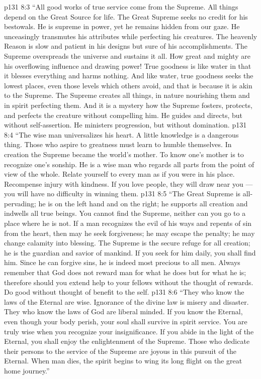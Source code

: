 \vs p131 8:3 “All good works of true service come from the Supreme. All things depend on the Great Source for life. The Great Supreme seeks no credit for his bestowals. He is supreme in power, yet he remains hidden from our gaze. He unceasingly transmutes his attributes while perfecting his creatures. The heavenly Reason is slow and patient in his designs but sure of his accomplishments. The Supreme overspreads the universe and sustains it all. How great and mighty are his overflowing influence and drawing power! True goodness is like water in that it blesses everything and harms nothing. And like water, true goodness seeks the lowest places, even those levels which others avoid, and that is because it is akin to the Supreme. The Supreme creates all things, in nature nourishing them and in spirit perfecting them. And it is a mystery how the Supreme fosters, protects, and perfects the creature without compelling him. He guides and directs, but without self\hyp{}assertion. He ministers progression, but without domination.
\vs p131 8:4 “The wise man universalizes his heart. A little knowledge is a dangerous thing. Those who aspire to greatness must learn to humble themselves. In creation the Supreme became the world’s mother. To know one’s mother is to recognize one’s sonship. He is a wise man who regards all parts from the point of view of the whole. Relate yourself to every man as if you were in his place. Recompense injury with kindness. If you love people, they will draw near you --- you will have no difficulty in winning them.
\vs p131 8:5 “The Great Supreme is all\hyp{}pervading; he is on the left hand and on the right; he supports all creation and indwells all true beings. You cannot find the Supreme, neither can you go to a place where he is not. If a man recognizes the evil of his ways and repents of sin from the heart, then may he seek forgiveness; he may escape the penalty; he may change calamity into blessing. The Supreme is the secure refuge for all creation; he is the guardian and savior of mankind. If you seek for him daily, you shall find him. Since he can forgive sins, he is indeed most precious to all men. Always remember that God does not reward man for what he does but for what he is; therefore should you extend help to your fellows without the thought of rewards. Do good without thought of benefit to the self.
\vs p131 8:6 “They who know the laws of the Eternal are wise. Ignorance of the divine law is misery and disaster. They who know the laws of God are liberal minded. If you know the Eternal, even though your body perish, your soul shall survive in spirit service. You are truly wise when you recognize your insignificance. If you abide in the light of the Eternal, you shall enjoy the enlightenment of the Supreme. Those who dedicate their persons to the service of the Supreme are joyous in this pursuit of the Eternal. When man dies, the spirit begins to wing its long flight on the great home journey.”
